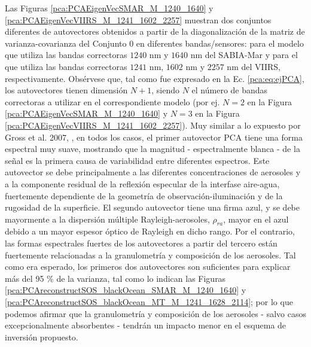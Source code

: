         Las Figuras \ref{pca:PCAEigenVecSMAR_M_1240_1640} y \ref{pca:PCAEigenVecVIIRS_M_1241_1602_2257} muestran dos conjuntos diferentes de autovectores obtenidos a partir de la diagonalización de la matriz de varianza-covarianza del Conjunto $0$ en diferentes bandas/sensores: para el modelo que utiliza las bandas correctoras $1240$ nm y $1640$ nm del SABIA-Mar y para el que utiliza las bandas correctoras $1241$ nm, $1602$ nm y $2257$ nm del VIIRS, respectivamente. Obsérvese que, tal como fue expresado en la Ec. \ref{pca:eq:ejPCA}, los autovectores tienen dimensión $N+1$, siendo $N$ el número de bandas correctoras a utilizar en el correspondiente modelo (por ej. $N=2$ en la Figura \ref{pca:PCAEigenVecSMAR_M_1240_1640} y $N=3$ en la Figura \ref{pca:PCAEigenVecVIIRS_M_1241_1602_2257}).
        Muy similar a lo expuesto por Gross et al. 2007, \cite{gross2007}, en todos los casos, el primer autovector PCA tiene una forma espectral muy suave, mostrando que la magnitud - espectralmente blanca - de la señal es la primera causa de variabilidad entre diferentes espectros. Este autovector se debe principalmente a las diferentes concentraciones de aerosoles y a la componente residual de la reflexión especular de la interfase aire-agua, fuertemente dependiente de la geometría de observación-iluminación y de la rugosidad de la superficie. El segundo autovector tiene una firma azul, y se debe mayormente a la dispersión múltiple Rayleigh-aerosoles, $\rho_{ra}$, mayor en el azul debido a un mayor espesor óptico de Rayleigh en dicho rango. Por el contrario, las formas espectrales fuertes de los autovectores a partir del tercero están fuertemente relacionadas a la granulometría y composición de los aerosoles. Tal como era esperado, los primeros dos autovectores son suficientes para explicar más del 95 \% de la varianza, tal como lo indican las Figuras \ref{pca:PCAreconstructSOS_blackOcean_SMAR_M_1240_1640} y \ref{pca:PCAreconstructSOS_blackOcean_MT_M_1241_1628_2114}; por lo que podemos afirmar que la granulometría y composición de los aerosoles - salvo casos excepcionalmente absorbentes - tendrán un impacto menor en el esquema de inversión propuesto.

